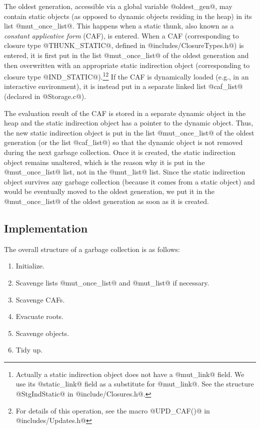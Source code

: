 \documentclass{article}
\begin{document}
The oldest generation, accessible via a global variable @oldest_gen@, may
contain static objects (as opposed to dynamic objects residing in the heap)
in its list @mut_once_list@. This happens when a static
thunk, also known as a \emph{constant applicative form} (CAF), is entered.
When a CAF (corresponding to closure type @THUNK_STATIC@, defined
in @includes/ClosureTypes.h@) is entered, 
it is first put in the list @mut_once_list@ of the oldest generation
and then overwritten with an appropriate static indirection object 
(corresponding to closure type @IND_STATIC@).\footnote{Actually a static 
indirection object does not have a @mut\_link@ field.
We use its @static\_link@ field as a substitute for @mut\_link@.
See the structure @StgIndStatic@ in @include/Closures.h@.}\footnote{For
details of this operation, see the macro @UPD\_CAF()@ in @includes/Updates.h@}
If the CAF is dynamically loaded (e.g., in an interactive environment), it is 
instead put in a separate linked list @caf_list@ 
(declared in @Storage.c@). 

The evaluation result of the 
CAF is stored in a separate dynamic object in the heap and the static 
indirection object has a pointer to the dynamic object.
Thus, the new static indirection object is put in the list 
@mut_once_list@ of the oldest generation (or the list @caf_list@) so that the 
dynamic object is not removed during the next garbage collection.
Once it is created, the static indirection object remains unaltered, which
is the reason why it is put in the @mut_once_list@ list, not in the 
@mut_list@ list.
Since the static indirection object survives any garbage collection (because
it comes from a static object) and would be eventually moved to the oldest 
generation,
we put it in the @mut_once_list@ of the oldest generation as soon
as it is created.

\subsection{Implementation}

The overall structure of a garbage collection is as follows:

\begin{enumerate}
\item[(1)] Initialize.
\item[(2)] Scavenge lists @mut_once_list@ and @mut_list@ if necessary.
\item[(3)] Scavenge CAFs.
\item[(4)] Evacuate roots.
\item[(5)] Scavenge objects.
\item[(6)] Tidy up.
\end{enumerate}
\end{document}
